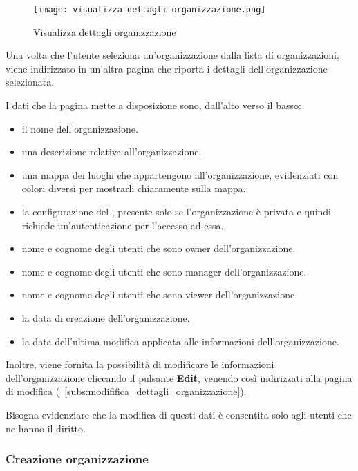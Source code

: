 \documentclass[../manuale-utente.tex]{subfiles}
\begin{document}
\begin{figure}[H]
    \centering
    \texttt{[image: visualizza-dettagli-organizzazione.png]}
    \caption{Visualizza dettagli organizzazione}%
    \label{fig:web_app_visualizza_dettagli_organizzazione}
\end{figure}

Una volta che l'utente seleziona un'organizzazione dalla lista di organizzazioni, viene indirizzato in un'altra pagina che riporta i dettagli dell'organizzazione selezionata.

I dati che la pagina mette a disposizione sono, dall'alto verso il basso:
\begin{itemize}
    \item il nome dell'organizzazione.
    \item una descrizione relativa all'organizzazione.
    \item una mappa dei luoghi che appartengono all'organizzazione, evidenziati con colori diversi per mostrarli chiaramente sulla mappa.
    \item la configurazione del , presente solo se l'organizzazione è privata e quindi richiede un'autenticazione per l'accesso ad essa.
    \item nome e cognome degli utenti che sono owner dell'organizzazione.
    \item nome e cognome degli utenti che sono manager dell'organizzazione.
    \item nome e cognome degli utenti che sono viewer dell'organizzazione.
    \item la data di creazione dell'organizzazione.
    \item la data dell'ultima modifica applicata alle informazioni dell'organizzazione.
\end{itemize}

Inoltre, viene fornita la possibilità di modificare le informazioni dell'organizzazione cliccando il pulsante \textbf{Edit}, venendo così indirizzati alla pagina di modifica (~\ref{subs:modififica_dettagli_organizzazione}).

Bisogna evidenziare che la modifica di questi dati è consentita solo agli utenti che ne hanno il diritto.
\newpage


\subsubsection{Creazione organizzazione}%
\label{subs:creazione_organizzazione}
\end{document}
